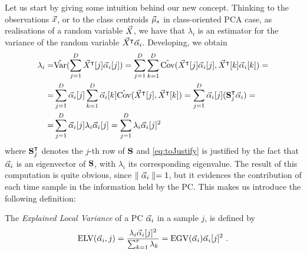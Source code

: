 %
Let us start by giving some intuition behind our new concept. Thinking to the observations ${\vec{x}}$, or to the class centroids ${\vec{\mu}_{s}}$ in class-oriented PCA case, as realisations of a random variable $\vec{X}$, we have that $\lambda_i$ is an estimator for the variance of the random variable $\vec{X}^\intercal\vec{\alpha}_i$. Developing, we obtain
\begin{align}\label{eq:ELV}
\lambda_i =& \hat{\mathrm{Var}}(\sum_{j=1}^D \vec{X}^\intercal[j]\vec{\alpha}_i[j]) = \sum_{j=1}^D\sum_{k=1}^D \hat{\mathrm{Cov}}(\vec{X}^\intercal[j]\vec{\alpha}_i[j], \vec{X}^\intercal[k]\vec{\alpha}_i[k])=\\
=& \sum_{j=1}^D \vec{\alpha}_i[j]\sum_{k=1}^D\vec{\alpha}_i[k]\hat{\mathrm{Cov}}(\vec{X}^\intercal[j], \vec{X}^\intercal[k])= \sum_{j=1}^D \vec{\alpha}_i[j] (\textbf{S}_{j}^\intercal \vec{\alpha}_i)=  \\
=& \sum_{j=1}^D \vec{\alpha}_i[j] \lambda_i\vec{\alpha}_i[j]= \sum_{j=1}^D  \lambda_i \vec{\alpha}_i[j]^2 \label{eq:toJustify}
\end{align}
where $\textbf{S}_{j}^\intercal$ denotes the $j$-th row of $\textbf{S}$ and \eqref{eq:toJustify} is justified by the fact that $\vec{\alpha}_i$ is an eigenvector of $\textbf{S}$, with $\lambda_i$ its corresponding eigenvalue. The result of this computation is quite obvious, since $\parallel \vec{\alpha}_i\parallel=1$, but it evidences the contribution of each time sample in the information held by the PC. This makes us introduce the following definition:
\begin{definition}


The {\em Explained Local Variance} of a PC $\vec{\alpha}_i$ in a sample $j$, is defined by
\begin{equation}
\mathrm{ELV}(\vec{\alpha}_i,j) = \frac{\lambda_i \vec{\alpha}_i[j]^2}{\sum_{k=1}^r\lambda_k} = \mathrm{EGV}(\vec{\alpha}_i) \vec{\alpha}_i[j]^2  \mbox{ .}
\end{equation}
\end{definition}
